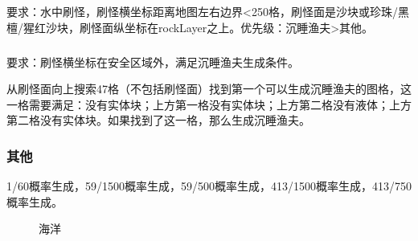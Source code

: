 \subsection{}
要求：水中刷怪，刷怪横坐标距离地图左右边界<250格，刷怪面是沙块或珍珠/黑檀/猩红沙块，刷怪面纵坐标在rockLayer之上。优先级：沉睡渔夫>其他。

\subsubsection{}
要求：刷怪横坐标在安全区域外，满足沉睡渔夫生成条件。

从刷怪面向上搜索47格（不包括刷怪面）找到第一个可以生成沉睡渔夫的图格，这一格需要满足：没有实体块；上方第一格没有实体块；上方第二格没有液体；上方第二格没有实体块。如果找到了这一格，那么生成沉睡渔夫。

\subsubsection{其他}
1/60概率生成，59/1500概率生成，59/500概率生成，413/1500概率生成，413/750概率生成。
\begin{figure}[!ht]
    \centering
    \caption{海洋}
\end{figure}

